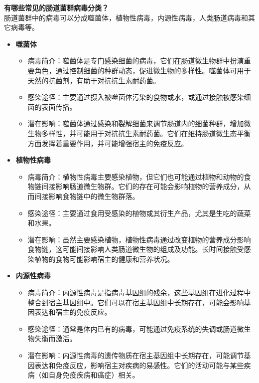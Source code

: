 \documentclass[UTF8]{ctexart}
\begin{document}
\begin{tcolorbox}[
    enhanced,
    colback=lightpurple!10, %
    colframe=white,  %
    arc=3mm,
    boxrule=0.5pt,
    width=\textwidth,
    top=8pt,
    bottom=8pt
]
{\small{\color{lightpurple}\faQuestionCircle}\quad \textbf{有哪些常见的肠道菌群病毒分类？}\\
{\color{orange!50}\faComments}\quad 肠道菌群中的病毒可以分成噬菌体，植物性病毒，内源性病毒，人类肠道病毒和其它病毒等。
\begin{itemize}
    \item \textbf{噬菌体}
    \begin{itemize}
        \item 病毒简介：噬菌体是专门感染细菌的病毒，它们在肠道微生物群中扮演重要角色，通过控制细菌的种群动态，促进微生物的多样性。噬菌体可用于天然的抗菌剂，有助于对抗抗生素耐药菌。
        \item 感染途径：主要通过摄入被噬菌体污染的食物或水，或通过接触被感染细菌的表面传播。
        \item 潜在影响：噬菌体通过感染和裂解细菌来调节肠道内的细菌种群，增加微生物多样性，并可能用于对抗抗生素耐药菌。它们在维持肠道微生态平衡方面发挥着重要作用，并可能增强宿主的免疫反应。
    \end{itemize}
    \item \textbf{植物性病毒}
    \begin{itemize}
        \item 病毒简介：植物性病毒主要感染植物，但它们也可能通过植物和动物的食物链间接影响肠道微生物群。它们的存在可能会影响植物的营养成分，从而间接影响食物链中的微生物群落。
        \item 感染途径：主要通过食用受感染的植物或其衍生产品，尤其是生吃的蔬菜和水果。
        \item 潜在影响：虽然主要感染植物，植物性病毒通过改变植物的营养成分影响食物链，这可能间接影响人类肠道微生物的组成及功能。长时间接触受感染植物的食物可能影响宿主的健康和营养状况。
    \end{itemize}
    \item \textbf{内源性病毒}
    \begin{itemize}
        \item 病毒简介：内源性病毒是指病毒基因组的残余，这些基因组在进化过程中整合到宿主基因组中。它们可以在宿主基因组中长期存在，可能会影响基因表达和宿主的免疫反应。
        \item 感染途径：通常是体内已有的病毒，可能通过免疫系统的失调或肠道微生物失衡而激活。
        \item 潜在影响：内源性病毒的遗传物质在宿主基因组中长期存在，可能调节基因表达和免疫反应，影响宿主对疾病的易感性。它们的活动可能与某些疾病（如自身免疫疾病和癌症）相关。
    \end{itemize}


\end{itemize}}
\end{tcolorbox}
\end{document}
